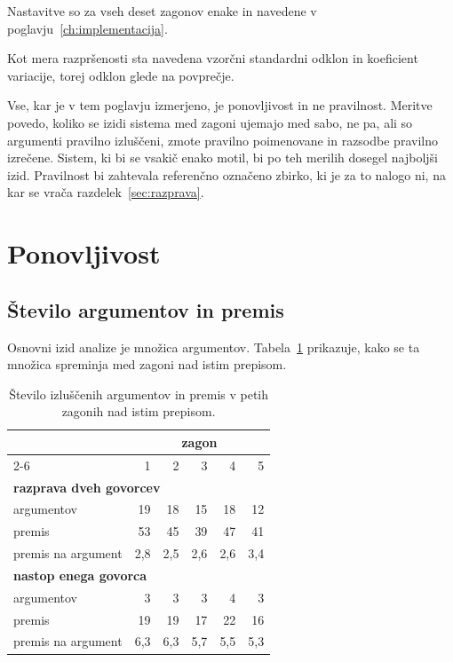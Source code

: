 \documentclass[a4paper, 12pt]{book}
\begin{document}
Nastavitve so za vseh deset zagonov enake in navedene v
poglavju~\ref{ch:implementacija}.

Kot mera razpršenosti sta navedena vzorčni standardni odklon in koeficient
variacije, torej odklon glede na povprečje.

Vse, kar je v tem poglavju izmerjeno, je ponovljivost in ne pravilnost. Meritve
povedo, koliko se izidi sistema med zagoni ujemajo med sabo, ne pa, ali so
argumenti pravilno izluščeni, zmote pravilno poimenovane in razsodbe pravilno
izrečene. Sistem, ki bi se vsakič enako motil, bi po teh merilih dosegel
najboljši izid. Pravilnost bi zahtevala referenčno označeno zbirko, ki je za to
nalogo ni, na kar se vrača razdelek~\ref{sec:razprava}.

\section{Ponovljivost}
\label{sec:ponovljivost}

\subsection{Število argumentov in premis}

Osnovni izid analize je množica argumentov. Tabela~\ref{tbl:ponovljivost}
prikazuje, kako se ta množica spreminja med zagoni nad istim prepisom.

\begin{table}[htbp]
\centering
\begin{tabular}{lrrrrr}
\toprule
& \multicolumn{5}{c}{zagon} \\
\cmidrule(l){2-6}
& 1 & 2 & 3 & 4 & 5 \\
\midrule
\multicolumn{6}{l}{\textbf{razprava dveh govorcev}} \\
argumentov          & 19 & 18 & 15 & 18 & 12 \\
premis              & 53 & 45 & 39 & 47 & 41 \\
premis na argument  & 2,8 & 2,5 & 2,6 & 2,6 & 3,4 \\
\midrule
\multicolumn{6}{l}{\textbf{nastop enega govorca}} \\
argumentov          & 3 & 3 & 3 & 4 & 3 \\
premis              & 19 & 19 & 17 & 22 & 16 \\
premis na argument  & 6,3 & 6,3 & 5,7 & 5,5 & 5,3 \\
\bottomrule
\end{tabular}
\caption{Število izluščenih argumentov in premis v petih zagonih nad istim
prepisom.}
\label{tbl:ponovljivost}
\end{table}
\end{document}
